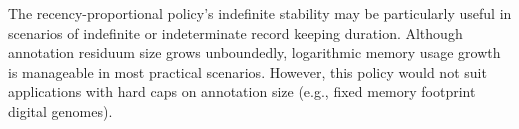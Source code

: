 The recency-proportional policy's indefinite stability may be particularly useful in scenarios of indefinite or indeterminate record keeping duration.
Although annotation residuum size grows unboundedly, logarithmic memory usage growth is manageable in most practical scenarios.
However, this policy would not suit applications with hard caps on annotation size (e.g., fixed memory footprint digital genomes).








